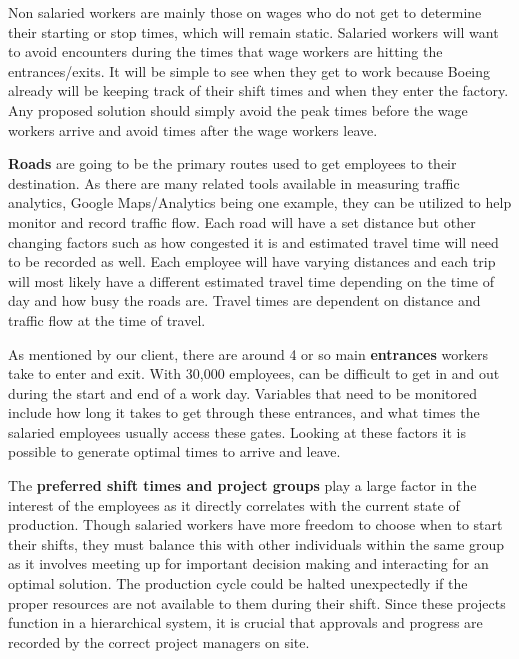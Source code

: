 \documentclass[onecolumn, draftclsnofoot,10pt, compsoc]{IEEEtran}
\begin{document}
Non salaried workers are mainly those on wages who do not get to determine their starting or stop times, which will remain static. Salaried workers will want to avoid encounters during the times that wage workers are hitting the entrances/exits. It will be simple to see when they get to work because Boeing already will be keeping track of their shift times and when they enter the factory. Any proposed solution should simply avoid the peak times before the wage workers arrive and avoid times after the wage workers leave.


\textbf{Roads} are going to be the primary routes used to get employees to their destination. 
As there are many related tools available in measuring traffic analytics, Google Maps/Analytics being one example, they can be utilized to help monitor and record traffic flow. 
Each road will have a set distance but other changing factors such as how congested it is and estimated travel time will need to be recorded as well. 
Each employee will have varying distances and each trip will most likely have a different estimated travel time depending on the time of day and how busy the roads are. 
Travel times are dependent on distance and traffic flow at the time of travel.


As mentioned by our client, there are around 4 or so main \textbf{entrances} workers take to enter and exit. 
With 30,000 employees, can be difficult to get in and out during the start and end of a work day. 
Variables that need to be monitored include how long it takes to get through these entrances, and what times the salaried employees usually access these gates. 
Looking at these factors it is possible to generate optimal times to arrive and leave.


The \textbf{preferred shift times and project groups} play a large factor in the interest of the employees as it directly correlates with the current state of production. 
Though salaried workers have more freedom to choose when to start their shifts, they must balance this with other individuals within the same group as it involves meeting up for important decision making and interacting for an optimal solution. 
The production cycle could be halted unexpectedly if the proper resources are not available to them during their shift.
Since these projects function in a hierarchical system, it is crucial that approvals and progress are recorded by the correct project managers on site.  

\end{document}

